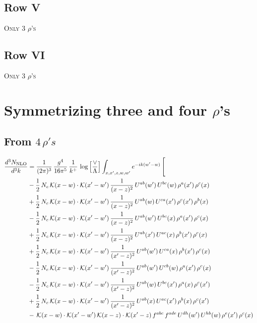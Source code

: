 \documentclass[9pt]{article}
\numberwithin{equation}{section}
\begin{document}
\subsection{Row V}
\textsc{Only 3 $\rho$'s}
\subsection{Row VI}
\textsc{Only 3 $\rho$'s}
\section{Symmetrizing three and four $\rho$'s}
\subsection{From $4\, \rho's$}
\begin{align}
\frac{d^{3}N_{\mathrm{NLO}}}{d^{3}k} & = \frac{1}{(2\pi)^{3}}\,\frac{g^{4}}{16\pi^{5}}\,\frac{1}{k^{+}}\,\log\Big[\frac{\vee}{\Lambda}\Big]\int_{x,x',z,w,w'}e^{-ik(w'-w)}\,\Bigg[\notag\\ & -\frac{1}{2}\,N_{c}\,\mathcal{K}(x-w)\cdot\mathcal{K}(x'-w')\,\frac{1}{(x-z)^{2}}\,U^{ab}(w')\,U^{bc}(w)\,\rho^{a}(x')\,\rho^{c}(x)\notag\\
& +\frac{1}{2}\,N_{c}\,\mathcal{K}(x-w)\cdot\mathcal{K}(x'-w')\,\frac{1}{(x-z)^{2}}\,U^{ab}(w)\,U^{ca}(x')\,\rho^{c}(x')\,\rho^{b}(x)\notag\\
& -\frac{1}{2}\,N_{c}\,\mathcal{K}(x-w)\cdot\mathcal{K}(x'-w')\,\frac{1}{(x-z)^{2}}\,U^{ab}(w')\,U^{bc}(x)\,\rho^{a}(x')\,\rho^{c}(x)\notag\\
& +\frac{1}{2}\,N_{c}\,\mathcal{K}(x-w)\cdot\mathcal{K}(x'-w')\,\frac{1}{(x-z)^{2}}\,U^{ab}(x')\,U^{ac}(x)\,\rho^{b}(x')\,\rho^{c}(x)\notag\\
& +\frac{1}{2}\,N_{c}\,\mathcal{K}(x-w)\cdot\mathcal{K}(x'-w')\,\frac{1}{(x'-z)^{2}}\,U^{ab}(w')\,U^{ca}(x)\,\rho^{b}(x')\,\rho^{c}(x)\notag\\
& -\frac{1}{2}\,N_{c}\,\mathcal{K}(x-w)\cdot\mathcal{K}(x'-w')\,\frac{1}{(x'-z)^{2}}\,U^{ab}(w')\,U^{cb}(w)\,\rho^{a}(x')\,\rho^{c}(x)\notag\\
& -\frac{1}{2}\,N_{c}\,\mathcal{K}(x-w)\cdot\mathcal{K}(x'-w')\,\frac{1}{(x'-z)^{2}}\,U^{ab}(w)\,U^{bc}(x')\,\rho^{a}(x)\,\rho^{c}(x')\notag\\
& +\frac{1}{2}\,N_{c}\,\mathcal{K}(x-w)\cdot\mathcal{K}(x'-w')\,\frac{1}{(x'-z)^{2}}\,U^{ab}(x)\,U^{ac}(x')\,\rho^{b}(x)\,\rho^{c}(x')\notag\\
& -\,\mathcal{K}(x-w)\cdot\mathcal{K}(x'-w')\,\mathcal{K}(x-z)\cdot\mathcal{K}(x'-z)\,f^{abc}\,f^{ade}\,U^{dh}(w')\,U^{hb}(w)\,\rho^{e}(x')\,\rho^{c}(x)\notag\\

\end{align}
\end{document}
